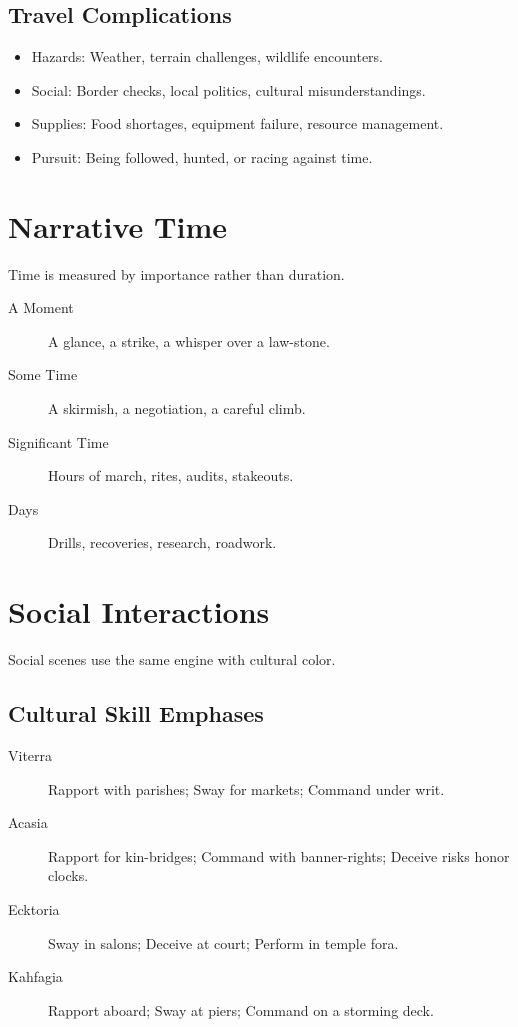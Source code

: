 \documentclass[11pt,twoside,openany]{book}
\begin{document}
\subsection*{Travel Complications}

\begin{itemize}
\item Hazards: Weather, terrain challenges, wildlife encounters.
\item Social: Border checks, local politics, cultural misunderstandings.
\item Supplies: Food shortages, equipment failure, resource management.
\item Pursuit: Being followed, hunted, or racing against time.
\end{itemize}

\section*{Narrative Time} 

Time is measured by importance rather than duration.

\begin{description}
\item[A Moment] A glance, a strike, a whisper over a law-stone.
\item[Some Time] A skirmish, a negotiation, a careful climb.
\item[Significant Time] Hours of march, rites, audits, stakeouts.
\item[Days] Drills, recoveries, research, roadwork.
\end{description}

\section*{Social Interactions} 

Social scenes use the same engine with cultural color.

\subsection*{Cultural Skill Emphases}

\begin{description}
\item[Viterra] Rapport with parishes; Sway for markets; Command under writ.
\item[Acasia] Rapport for kin-bridges; Command with banner-rights; Deceive risks honor clocks.
\item[Ecktoria] Sway in salons; Deceive at court; Perform in temple fora.
\item[Kahfagia] Rapport aboard; Sway at piers; Command on a storming deck.
\end{description}
\end{document}
